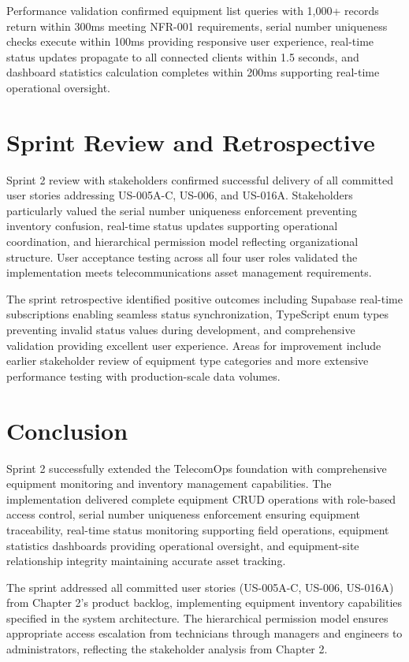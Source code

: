 Performance validation confirmed equipment list queries with 1,000+ records return within 300ms meeting NFR-001 requirements, serial number uniqueness checks execute within 100ms providing responsive user experience, real-time status updates propagate to all connected clients within 1.5 seconds, and dashboard statistics calculation completes within 200ms supporting real-time operational oversight.

\section{Sprint Review and Retrospective}

Sprint 2 review with stakeholders confirmed successful delivery of all committed user stories addressing US-005A-C, US-006, and US-016A. Stakeholders particularly valued the serial number uniqueness enforcement preventing inventory confusion, real-time status updates supporting operational coordination, and hierarchical permission model reflecting organizational structure. User acceptance testing across all four user roles validated the implementation meets telecommunications asset management requirements.

The sprint retrospective identified positive outcomes including Supabase real-time subscriptions enabling seamless status synchronization, TypeScript enum types preventing invalid status values during development, and comprehensive validation providing excellent user experience. Areas for improvement include earlier stakeholder review of equipment type categories and more extensive performance testing with production-scale data volumes.

\section{Conclusion}

Sprint 2 successfully extended the TelecomOps foundation with comprehensive equipment monitoring and inventory management capabilities. The implementation delivered complete equipment CRUD operations with role-based access control, serial number uniqueness enforcement ensuring equipment traceability, real-time status monitoring supporting field operations, equipment statistics dashboards providing operational oversight, and equipment-site relationship integrity maintaining accurate asset tracking.

The sprint addressed all committed user stories (US-005A-C, US-006, US-016A) from Chapter 2's product backlog, implementing equipment inventory capabilities specified in the system architecture. The hierarchical permission model ensures appropriate access escalation from technicians through managers and engineers to administrators, reflecting the stakeholder analysis from Chapter 2.

